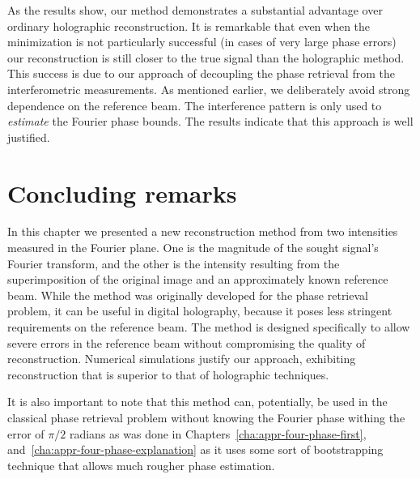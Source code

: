 As the results show, our method demonstrates a substantial
advantage over ordinary holographic reconstruction. It is
remarkable that even when the minimization is not particularly
successful (in cases of very large phase errors) our
reconstruction is still closer to the true signal than the
holographic method. This success is due to our approach of
decoupling the phase retrieval from the interferometric
measurements. As mentioned earlier, we deliberately avoid strong
dependence on the reference beam. The interference pattern is only
used to \textit{estimate} the Fourier phase bounds. The results
indicate that this approach is well justified.


\section{Concluding remarks}
\label{sec:phase-holo-conclusions}
In this chapter we presented a new reconstruction method from two
intensities measured in the Fourier plane. One is the magnitude of the
sought signal's Fourier transform, and the other is the intensity
resulting from the superimposition of the original image and an
approximately known reference beam. While the method was originally
developed for the phase retrieval problem, it can be useful in digital
holography, because it poses less stringent requirements on the
reference beam. The method is designed specifically to allow severe
errors in the reference beam without compromising the quality of
reconstruction. Numerical simulations justify our approach, exhibiting
reconstruction that is superior to that of holographic techniques.

It is also important to note that this method can, potentially,  be used in the
classical phase retrieval problem without knowing the Fourier phase
withing the error of $\pi/2$ radians as was done in
Chapters~\ref{cha:appr-four-phase-first},
and~\ref{cha:appr-four-phase-explanation} as it uses some sort of
bootstrapping  technique that allows much rougher phase estimation.  















